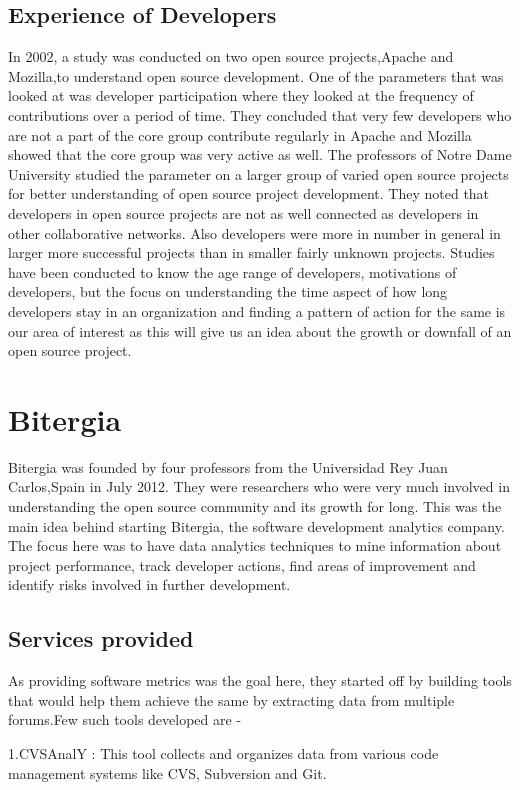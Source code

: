 \documentclass[double,12pt]{beavtex}
\begin{document}
\section{Experience of Developers}
In 2002, a study was conducted on two open source projects,Apache and Mozilla,to understand open source development. One of the parameters that was looked at was developer participation where they looked at the frequency of contributions over a period of time. They concluded that very few developers who are not a part of the core group contribute regularly in Apache and Mozilla showed that the core group was very active as well\cite{mockus2002}. The professors of Notre Dame University studied the parameter on a larger group of varied open source projects for better understanding of open source project development. They noted that developers in open source projects are not as well connected as developers in other collaborative networks. Also developers were more in number in general in larger more successful projects than in smaller fairly unknown projects\cite{greg2002}. Studies have been conducted to know the age range of developers, motivations of developers, but the focus on understanding the time aspect of how long developers stay in an organization and finding a pattern of action for the same is our area of interest as this will give us an idea about the growth or downfall of an open source project.


\chapter{Bitergia}
Bitergia was founded by four professors from the 	
Universidad Rey Juan Carlos,Spain in July 2012. They were researchers who were very much involved in understanding the open source community and its growth for long. This was the main idea behind starting Bitergia, the software development analytics company. The focus here was to have data analytics techniques to mine information about project performance, track developer actions, find areas of improvement and identify risks involved in further development. 
\section{Services provided}
As providing software metrics was the goal here, they started off by building tools that would help them achieve the same by extracting data from multiple forums.Few such tools developed are - 

1.CVSAnalY : This tool collects and organizes data from various code management systems like CVS, Subversion and Git.
\end{document}
